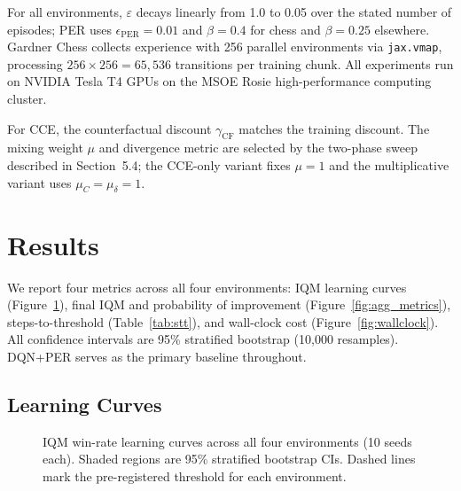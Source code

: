 \documentclass[conference]{IEEEtran}
\begin{document}
\noindent For all environments, $\varepsilon$ decays linearly from 1.0 to 0.05 over the stated number of episodes; PER uses $\epsilon_{\text{PER}} = 0.01$ and $\beta = 0.4$ for chess and $\beta = 0.25$ elsewhere. Gardner Chess collects experience with 256 parallel environments via \texttt{jax.vmap}, processing $256 \times 256 = 65{,}536$ transitions per training chunk. All experiments run on NVIDIA Tesla T4 GPUs on the MSOE Rosie high-performance computing cluster.

For CCE, the counterfactual discount $\gamma_{\text{CF}}$ matches the training discount. The mixing weight $\mu$ and divergence metric are selected by the two-phase sweep described in Section~5.4; the CCE-only variant fixes $\mu = 1$ and the multiplicative variant uses $\mu_C = \mu_\delta = 1$.

\section{Results}

We report four metrics across all four environments: IQM learning curves (Figure~\ref{fig:iqm_curves}), final IQM and probability of improvement (Figure~\ref{fig:agg_metrics}), steps-to-threshold (Table~\ref{tab:stt}), and wall-clock cost (Figure~\ref{fig:wallclock}).
All confidence intervals are 95\% stratified bootstrap (10{,}000 resamples).
DQN+PER serves as the primary baseline throughout.

\subsection{Learning Curves}

\begin{figure}[t]
\centering
\caption{IQM win-rate learning curves across all four environments (10 seeds each). Shaded regions are 95\% stratified bootstrap CIs. Dashed lines mark the pre-registered threshold for each environment.}
\label{fig:iqm_curves}
\end{figure}
\end{document}
